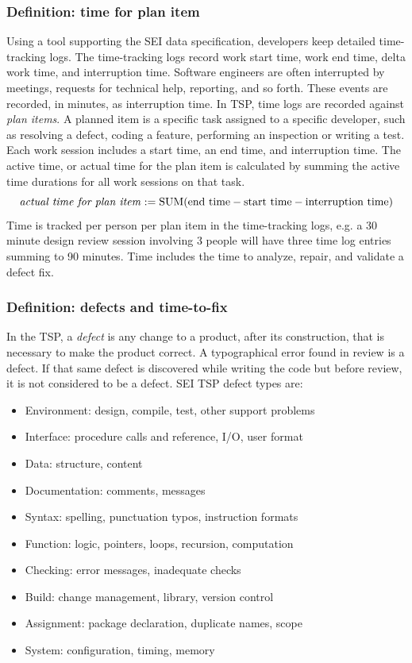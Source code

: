 \documentclass[smallcondensed]{svjour3}
\newcommand{\bi}{\begin{itemize}}%
\newcommand{\ei}{\end{itemize}}
\begin{document}
\subsubsection{Definition: time for plan item}

Using a tool supporting the SEI data specification, developers keep detailed time-tracking logs. The time-tracking logs record  work start time, work end time,  delta
work time, and interruption time. Software engineers are often
interrupted by meetings, requests for technical help, reporting, and
so forth. These events are recorded, in minutes, as interruption
time. In TSP, time logs are recorded against \textit{plan items}. A planned item is a specific task assigned to a specific developer, such as resolving a defect, coding a feature, performing an inspection or writing a test. Each  work session includes a start time, an end time, and interruption time. The active time, or actual time for the plan item is calculated by summing the active time durations for all work sessions on that task.
\[
\text{\emph{actual time for plan item}} := \text{SUM(}\text{end time} - \text{start time} - \text{interruption time}) 
\]
Time is tracked per person per plan item in the time-tracking logs, e.g. a 30 minute design review session involving 3 people will have three time log entries summing to 90 minutes. Time includes the time to analyze, repair, and validate a defect fix.



\subsubsection{Definition: defects and time-to-fix}\label{tion:defin}
In the TSP, a  \emph{defect} is any change to a product, after its construction, that is necessary to make the product correct.  A typographical error found in review is a defect. If that same defect is discovered while writing the code but before review, it is not considered to be a defect. 
SEI TSP defect types are:
\bi
\item Environment: design, compile, test,  other support  problems
\item Interface: procedure calls and reference, I/O, user format
\item Data: structure, content
\item Documentation: comments, messages
\item Syntax: spelling, punctuation typos, instruction formats
\item Function: logic, pointers, loops, recursion, computation  
\item Checking: error messages, inadequate checks
\item Build: change management, library, version control
\item Assignment: package
declaration, duplicate names, scope
\item System: configuration, timing, memory
\ei
\end{document}

